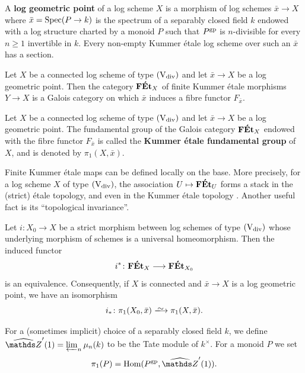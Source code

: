 A {\bf log geometric point} of a log scheme $X$ is a morphism of log schemes $\bar{x}\to X$ where $\bar{x} = \operatorname{Spec}(P\to k)$ is the spectrum of a separably closed field $k$ endowed with a log structure charted by a monoid $P$ such that $P^{\rm gp}$ is $n$-divisible for every $n\geq 1$ invertible in $k$. Every non-empty Kummer \'etale log scheme over such an $\bar{x}$ has a section.

\begin{thm} \label{thm:FKEt-Galois}
    Let $X$ be a connected log scheme of type $(\mathrm{V}_{\rm div})$ and let $\bar{x}\to X$ be a log geometric point. Then the category $\mathbf{F\acute{E}t}_X$ of finite Kummer \'etale morphisms $Y\to X$ is a Galois category on which $\bar{x}$ induces a fibre functor $F_{\bar{x}}$. 
\end{thm}

\begin{defi} \label{def:FKEt-pi1}
    Let $X$ be a connected log scheme of type $(\mathrm{V}_{\rm div})$ and let $\bar{x}\to X$ be a log geometric point. The fundamental group of the Galois category $\mathbf{F\acute{E}t}_X$ endowed with the fibre functor $F_{\bar{x}}$ is called the {\bf Kummer \'etale fundamental group} of $X$, and is denoted by $\pi_1(X, \bar{x})$.
\end{defi}

Finite Kummer \'etale maps can be defined locally on the base. More precisely, for a log scheme $X$ of type $(\mathrm{V}_{\rm div})$, the association $U\mapsto \mathbf{F\acute{E}t}_U$ forms a stack in the (strict) \'etale topology, and even in the Kummer \'etale topology \cite[Corollary~4.3.7]{AHLS-Log}. 
Another useful fact is its ``topological invariance''.

\begin{prop} \label{prop:FKEt-top-inv}
    Let $i\colon X_0\to X$ be a strict morphism between log schemes of type $(\mathrm{V}_{\rm div})$ whose underlying morphism of schemes is a universal homeomorphism. Then the induced functor
    \[ 
        i^*\colon \mathbf{F\acute{E}t}_X \longrightarrow \mathbf{F\acute{E}t}_{X_0}
    \]
    is an equivalence. Consequently, if $X$ is connected and $\bar x\to X$ is a log geometric point, we have an isomorphism
    \[ 
        i_* \colon \pi_1(X_0, \bar{x}) \isomto \pi_1(X, \bar{x}).
    \]
\end{prop}

\begin{defi}
\label{defi:pi1-of-monoid}
    For a (sometimes implicit) choice of a separably closed field $k$, we define $\widehat{\bZ}'(1) = \varprojlim_n \mu_n(k)$ to be the Tate module of $k^\times$.
    For a monoid $P$ we set
    \[
        \pi_1(P) = \Hom(P^{\rm gp}, \widehat{\bZ}'(1)).
    \]
\end{defi}

